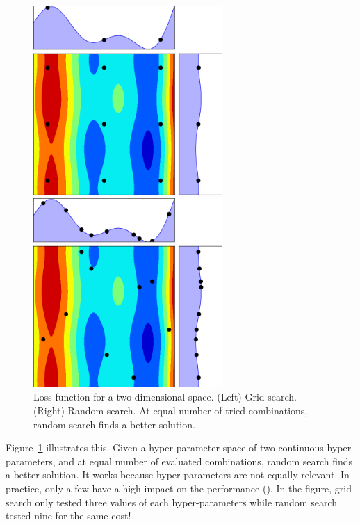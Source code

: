 \begin{figure}[htb]
	\begin{minipage}[b]{.49\linewidth}
		\centering
		\centerline{\includegraphics[width=7.2cm]{img_hyperopt/rs_grid}}
	\end{minipage}
	\begin{minipage}[b]{.49\linewidth}
		\centering
		\centerline{\includegraphics[width=7.2cm]{img_hyperopt/rs_random}}
	\end{minipage}
	\caption{Loss function for a two dimensional space. (Left) Grid search. (Right) Random search. At equal number of tried combinations, random search finds a better solution.}
	\label{fig:rs}
\end{figure}

Figure~\ref{fig:rs} illustrates this. Given a hyper-parameter space of two continuous hyper-parameters, and at equal number of evaluated combinations, random search finds a better solution. It works because hyper-parameters are not equally relevant. In practice, only a few have a high impact on the performance (\textcite{bergstra2012JMLR}). In the figure, grid search only tested three values of each hyper-parameters while random search tested nine for the same cost!

